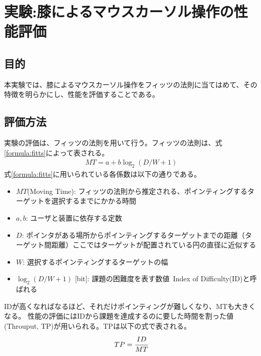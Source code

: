 \chapter{実験:膝によるマウスカーソル操作の性能評価}
\section{目的}
本実験では、膝によるマウスカーソル操作をフィッツの法則に当てはめて、その特徴を明らかにし、性能を評価することである。
\section{評価方法}
実験の評価は、フィッツの法則を用いて行う。フィッツの法則は、式\ref{formula:fitts}によって表される。
\begin{eqnarray}
	MT = a + b\log_2{(D/W + 1)}
	\label{formula:fitts}
\end{eqnarray}
式\ref{formula:fitts}に用いられている各係数は以下の通りである。
\begin{itemize}
	\item {$MT$(Moving Time): }フィッツの法則から推定される、ポインティングするターゲットを選択するまでにかかる時間
	\item {$a,b$: }ユーザと装置に依存する定数
	\item {$D$: }ポインタがある場所からポインティングするターゲットまでの距離（ターゲット間距離）ここではターゲットが配置されている円の直径に近似する
	\item {$W$: }選択するポインティングするターゲットの幅
	\item { $\log_2{(D/W + 1)}$ [bit]: } 課題の困難度を表す数値\ Index of Difficulty(ID)と呼ばれる
\end{itemize}
IDが高くなればなるほど、それだけポインティングが難しくなり、MTも大きくなる。
性能の評価にはIDから課題を達成するのに要した時間を割った値(Throuput, TP)が用いられる。TPは以下の式で表される。
\begin{eqnarray}
	TP = \cfrac{ID}{MT}
	\label{formula:fitts}
\end{eqnarray}
